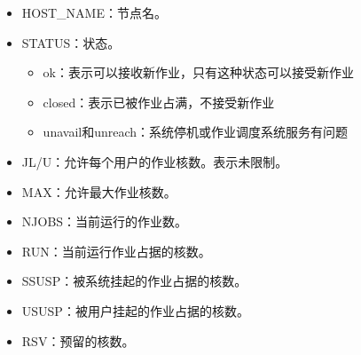 \documentclass[a4paper,12pt,english]{sphinxmanual}
\begin{document}
\sphinxAtStartPar
{}

\begin{sphinxVerbatim}[commandchars=\\\{\}]
                
                                           
                                               
                                               
\end{sphinxVerbatim}
\begin{itemize}
\item {} 
\sphinxAtStartPar
HOST\_NAME：节点名。

\item {} 
\sphinxAtStartPar
STATUS：状态。
\begin{itemize}
\item {} 
\sphinxAtStartPar
ok：表示可以接收新作业，只有这种状态可以接受新作业

\item {} 
\sphinxAtStartPar
closed：表示已被作业占满，不接受新作业

\item {} 
\sphinxAtStartPar
unavail和unreach：系统停机或作业调度系统服务有问题

\end{itemize}

\item {} 
\sphinxAtStartPar
JL/U：允许每个用户的作业核数。\sphinxhyphen{}表示未限制。

\item {} 
\sphinxAtStartPar
MAX：允许最大作业核数。

\item {} 
\sphinxAtStartPar
NJOBS：当前运行的作业数。

\item {} 
\sphinxAtStartPar
RUN：当前运行作业占据的核数。

\item {} 
\sphinxAtStartPar
SSUSP：被系统挂起的作业占据的核数。

\item {} 
\sphinxAtStartPar
USUSP：被用户挂起的作业占据的核数。

\item {} 
\sphinxAtStartPar
RSV：预留的核数。

\end{itemize}
\end{document}
